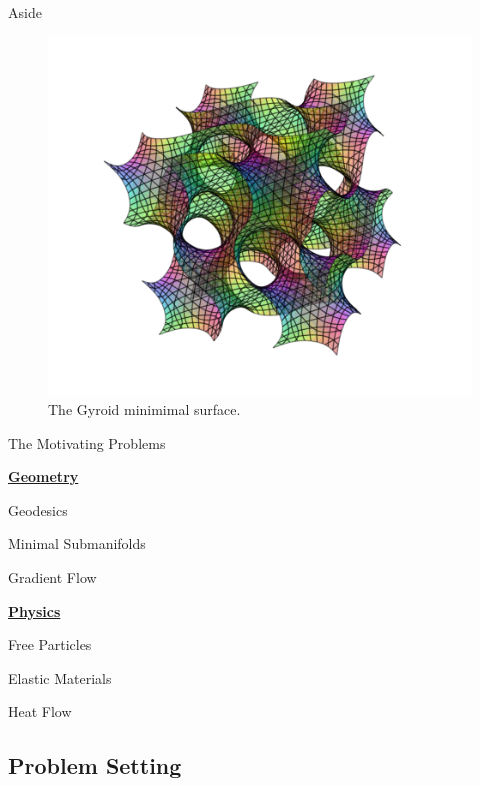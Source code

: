 \documentclass[usenames,dvipsnames]{beamer}
\theoremstyle{definition}
\theoremstyle{theorem}
\begin{document}
        \begin{frame}{Aside}
            \begin{figure}[H]
            \centering
            \includegraphics[width=.6\textwidth]{images/gyroid_fixed.png}
            \caption{The Gyroid minimimal surface.}
            \end{figure}
        \end{frame}
        
        \begin{frame}{The Motivating Problems}
            \begin{itemize}
            \begin{minipage}{0.55\linewidth}
                \item[] \textbf{\underline{Geometry}}
                \item Geodesics
                \item Minimal Submanifolds
                \item Gradient Flow
            \end{minipage}
            \begin{minipage}{0.4\linewidth}
                \item[] \textbf{\underline{Physics}}
                \item Free Particles
                \item Elastic Materials
                \item Heat Flow
            \end{minipage}
            \end{itemize}
        \end{frame}
        
    \subsection{Problem Setting}
\end{document}
